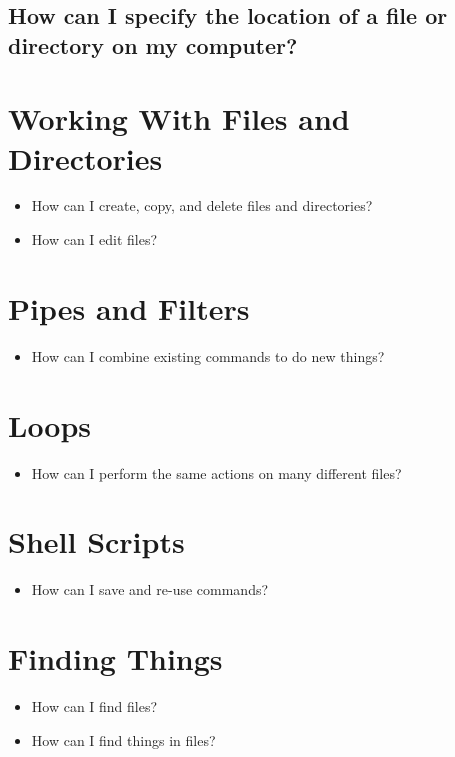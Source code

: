 \documentclass[11pt]{article}
\begin{document}
\subsection*{How can I specify the location of a file or directory on my computer?}
\label{sec:orgcc3706d}
\section*{Working With Files and Directories}
\label{sec:orgec316d5}
\begin{itemize}
\item How can I create, copy, and delete files and directories?
\item How can I edit files?
\end{itemize}
\section*{Pipes and Filters}
\label{sec:org566376f}
\begin{itemize}
\item How can I combine existing commands to do new things?
\end{itemize}
\section*{Loops}
\label{sec:org7676337}
\begin{itemize}
\item How can I perform the same actions on many different files?
\end{itemize}
\section*{Shell Scripts}
\label{sec:org5d053dc}
\begin{itemize}
\item How can I save and re-use commands?
\end{itemize}
\section*{Finding Things}
\label{sec:org9a180c6}
\begin{itemize}
\item How can I find files?
\item How can I find things in files?
\end{itemize}
\end{document}

